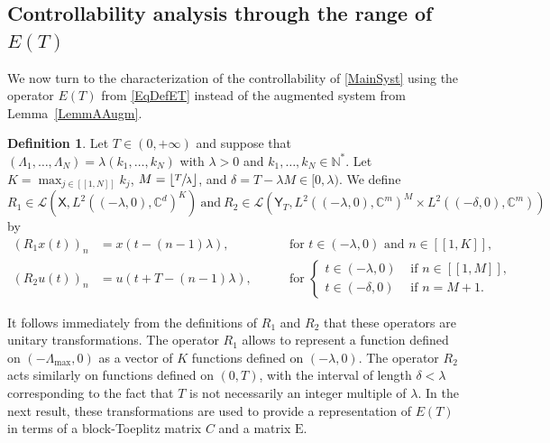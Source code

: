 \documentclass[JEP,XML,SOM,Unicode]{cedram}
\newcommand{\llbracket}{[\![}
\newcommand{\rrbracket}{]\!]}
\theoremstyle{plain}
\theoremstyle{definition}
\newtheorem{defi}[theo]{Definition}
\newcommand{\floor}[1]{\left\lfloor #1 \right\rfloor}
\newcommand{\Epsilon}{\mathrm E}
\begin{document}
\subsection{\texorpdfstring{Controllability analysis through the range of $E(T)$}{Controllability analysis through the range of E(T)}}

We now turn to the characterization of the controllability of \eqref{MainSyst} using the operator $E(T)$ from \eqref{EqDefET} instead of the augmented system from Lemma~\ref{LemmAAugm}.

\begin{defi}
\label{DefiR1R2}
Let $T \in (0, +\infty)$ and suppose that $(\Lambda_1, \dots, \Lambda_N) = \lambda (k_1, \dots, k_N)$ with $\lambda > 0$ and $k_1, \dots, k_N \in \mathbb N^\ast$. Let $K = \max_{j \in \llbracket 1, N\rrbracket} k_j$, $M = \floor{\sfrac{T}{\lambda}}$, and $\delta = T - \lambda M \in [0, \lambda)$. We define
\[
R_1 \in \mathcal L\left(\mathsf X, L^2((-\lambda, 0), \mathbb C^d)^K\right)\ \text{and}\ R_2 \in \mathcal L\left(\mathsf Y_T, L^2((-\lambda, 0), \mathbb C^m)^M \times L^2((-\delta, 0), \mathbb C^m)\right)
\]
by\vspace*{-3pt}
\[
\begin{aligned}
(R_1 x(t))_n & = x(t - (n-1)\lambda), & \quad & \text{ for } t \in (-\lambda, 0) \text{ and } n \in \llbracket 1, K\rrbracket, \\
(R_2 u(t))_n & = u(t + T - (n-1)\lambda), & & \text{ for } \left\{
\begin{aligned}
t \in (-\lambda, 0) & \text{ if } n \in \llbracket 1, M\rrbracket, \\
t \in (-\delta, 0) & \text{ if } n = M+1.
\end{aligned}\right.
\end{aligned}
\]
\end{defi}

It follows immediately from the definitions of $R_1$ and $R_2$ that these operators are unitary transformations. The operator $R_1$ allows to represent a function defined on $(-\Lambda_{\max}, 0)$ as a vector of $K$ functions defined on $(-\lambda, 0)$. The operator $R_2$ acts similarly on functions defined on $(0, T)$, with the interval of length $\delta < \lambda$ corresponding to the fact that $T$ is not necessarily an integer multiple of $\lambda$. In the next result, these transformations are used to provide a representation of $E(T)$ in terms of a block-Toeplitz matrix $C$ and a matrix $\Epsilon$.
\end{document}
